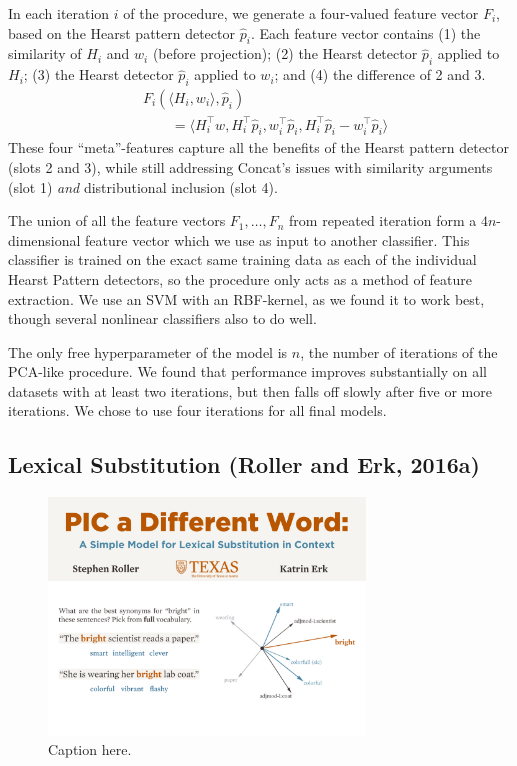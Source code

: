 \documentclass[12pt]{article}
\begin{document}
In each iteration $i$ of the procedure, we generate a four-valued feature vector
$F_i$, based on the Hearst pattern detector $\hat p_i$. Each
feature vector contains (1) the similarity of $H_i$ and $w_i$ (before projection);
(2) the Hearst detector
$\hat p_i$ applied to $H_i$; (3) the Hearst detector $\hat p_i$ applied to $w_i$; and
(4) the difference of 2 and 3.
\begin{align*}
  & F_i(\langle H_i, w_i\rangle, \hat p_i)\\
  & \qquad = \langle H_i^{\top}w, H_i^\top\hat p_i, w_i^\top\hat p_i, H_i^\top\hat p_i - w_i^\top\hat p_i\rangle
\end{align*}
These four ``meta''-features capture all the benefits of the Hearst pattern
detector (slots 2 and 3), while still addressing Concat's issues with
similarity arguments (slot 1) {\em and} distributional inclusion (slot 4).

The union of all the feature vectors $F_1, \ldots, F_n$ from repeated iteration form a
$4n$-dimensional feature vector which we use as input to another classifier.
This classifier is trained on the exact same training data as each of the
individual Hearst Pattern detectors, so the procedure only acts as a method of
feature extraction. We use an SVM with an RBF-kernel, as we found it to work
best, though several nonlinear classifiers also to do well.

The only free hyperparameter of the model is $n$, the number of iterations of
the PCA-like procedure. We found that performance improves substantially on all
datasets with at least two iterations, but then falls off slowly after five or
more iterations. We chose to use four iterations for all final models.

\subsection{Lexical Substitution (Roller and Erk, 2016a)}
\label{sec:pic}

\begin{figure}
  \centering
  \includegraphics[width=0.75\textwidth]{figures/substitution}
  \caption{Caption here.}
  \label{fig:substitution}
\end{figure}
\end{document}
